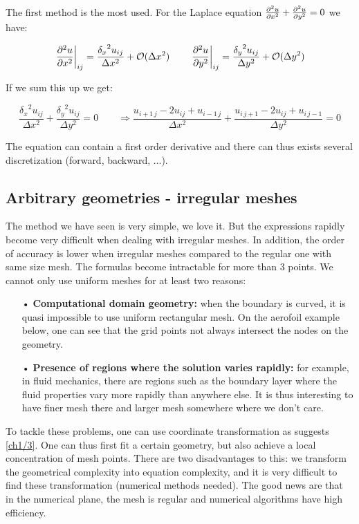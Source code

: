 The first method is the most used. For the Laplace equation $\frac{\partial ^2 u}{\partial x^2}+ \frac{\partial ^2 u}{\partial y^2} = 0$ we have: 

\begin{equation}
\left. \frac{\partial^2 u}{\partial x^2} \right|_{ij} = \frac{{\delta_x} ^2u_{ij}}{\Delta x^2} + \mathcal{O}(\Delta x^2) \qquad \left. \frac{\partial^2 u}{\partial y^2} \right|_{ij} = \frac{{\delta _y} ^2u_{ij}}{\Delta y^2} + \mathcal{O}(\Delta y^2)
\end{equation}

If we sum this up we get: 

\begin{equation}
\frac{{\delta _x} ^2u_{ij}}{\Delta x^2} + \frac{{\delta _y} ^2u_{ij}}{\Delta y^2} = 0 \qquad \Rightarrow \frac{u_{i+1 \, j} - 2u_{ij} + u_{i-1\, j}}{\Delta x ^2} + \frac{u_{i \, j+1} - 2u_{ij} + u_{i\, j-1}}{\Delta y ^2} = 0
\end{equation}

The equation can contain a first order derivative and there can thus exists several discretization (forward, backward, ...). 

\subsection{Arbitrary geometries - irregular meshes}
The method we have seen is very simple, we love it. But the expressions rapidly become very difficult when dealing with irregular meshes. In addition, the order of accuracy is lower when irregular meshes compared to the regular one with same size mesh. The formulas become intractable for more than 3 points.  We cannot only use uniform meshes for at least two reasons: \\

\begin{itemize}
\item[•] \textbf{Computational domain geometry:} when the boundary is curved, it is quasi impossible to use uniform rectangular mesh. On the aerofoil example below, one can see that the grid points not always intersect the nodes on the geometry.  
\item[•] \textbf{Presence of regions where the solution varies rapidly:} for example, in fluid mechanics, there are regions such as the boundary layer where the fluid properties vary more rapidly than anywhere else. It is thus interesting to have finer mesh there and larger mesh somewhere where we don't care. 
\end{itemize}


To tackle these problems, one can use coordinate transformation as suggests \autoref{ch1/3}. One can thus first fit a certain geometry, but also achieve a local concentration of mesh points. There are two disadvantages to this: we transform the geometrical complexity into equation complexity, and it is very difficult to find these transformation (numerical methods needed). The good news are that in the numerical plane, the mesh is regular and numerical algorithms have high efficiency. 